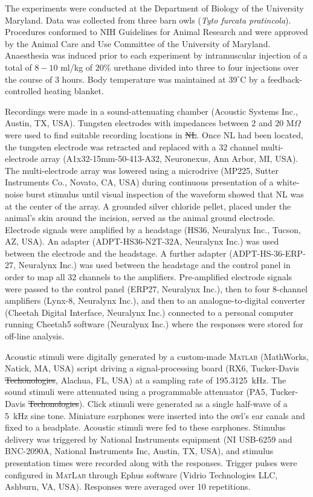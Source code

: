 \documentclass[]{article}
\providecommand{\DIFaddtex}[1]{{\protect\color{blue}\uwave{#1}}} %
\providecommand{\DIFdeltex}[1]{{\protect\color{red}\sout{#1}}}                      %
\providecommand{\DIFaddbegin}{} %
\providecommand{\DIFaddend}{} %
\providecommand{\DIFdelbegin}{} %
\providecommand{\DIFdelend}{} %
\providecommand{\DIFadd}[1]{\texorpdfstring{\DIFaddtex{#1}}{#1}} %
\providecommand{\DIFdel}[1]{\texorpdfstring{\DIFdeltex{#1}}{}} %
\begin{document}
The experiments were conducted at the Department of Biology of the
University \DIFaddbegin \DIFadd{of }\DIFaddend Maryland. Data was collected from three barn owls
(\emph{Tyto furcata pratincola}). Procedures conformed to NIH Guidelines
for Animal Research and were approved by the Animal Care and Use
Committee of the University of Maryland. Anaesthesia was induced prior
to each experiment by intramuscular injection of a total of \(8-10\)
ml/kg of \(20\%\) urethane divided into three to four injections over
the course of \(3\) hours. Body temperature was maintained at
\(39^\circ\)C by a feedback-controlled heating blanket.

Recordings were made in a sound-attenuating chamber (Acoustic Systems
Inc., Austin, TX, USA). Tungsten electrodes with impedances between
\(2\) and \(20\) M\(\Omega\) were used to find suitable recording
locations in \DIFdelbegin \DIFdel{NL}\DIFdelend \DIFaddbegin \DIFadd{nucleus laminaris (NL)}\DIFaddend . Once NL had been located, the
tungsten electrode was retracted and replaced with a 32 channel
multi-electrode array (A1x32-15mm-50-413-A32, Neuronexus, Ann Arbor, MI,
USA). The multi-electrode array was lowered using a microdrive (MP225,
Sutter Instruments Co., Novato, CA, USA) during continuous presentation
of a white-noise burst stimulus until visual inspection of the waveform
showed that NL was at the center of the array. A grounded silver
chloride pellet, placed under the animal's skin around the incision,
served as the animal ground electrode. Electrode signals were amplified
by a headstage (HS36, Neuralynx Inc., Tucson, AZ, USA). An adapter
(ADPT-HS36-N2T-32A, Neuralynx Inc.) was used between the electrode and
the headstage. A further adapter (ADPT-HS-36-ERP-27, Neuralynx Inc.) was
used between the headstage and the control panel in order to map all 32
channels to the amplifiers. Pre-amplified electrode signals were passed
to the control panel (ERP27, Neuralynx Inc.), then to four 8-channel
amplifiers (Lynx-8, Neuralynx Inc.), and then to an analogue-to-digital
converter (Cheetah Digital Interface, Neuralynx Inc.) connected to a
personal computer running Cheetah5 software (Neuralynx Inc.) where the
responses were stored for off-line analysis.

Acoustic stimuli were digitally generated by a custom-made
\textsc{Matlab} (MathWorks, Natick, MA, USA) script driving a
signal-processing board (RX6, Tucker-Davis \DIFdelbegin \DIFdel{Techonologies}\DIFdelend \DIFaddbegin \DIFadd{Technologies}\DIFaddend , Alachua, FL,
USA) at a sampling rate of 195.3125~kHz. The sound stimuli were
attenuated using a programmable attenuator (PA5, Tucker-Davis
\DIFdelbegin \DIFdel{Techonologies}\DIFdelend \DIFaddbegin \DIFadd{Technologies}\DIFaddend ). Click stimuli were generated as a single half-wave of a
5~kHz sine tone. Miniature earphones were inserted into the owl's ear
canals and fixed to a headplate. Acoustic stimuli were fed to these
earphones. Stimulus delivery was triggered by National Instruments
equipment (NI USB-6259 and BNC-2090A, National Instruments Inc, Austin,
TX, USA), and stimulus presentation times were recorded along with the
responses. Trigger pulses were configured in \textsc{MatLab} through
Ephus software (Vidrio Technologies LLC, Ashburn, VA, USA). Responses
were averaged over 10 repetitions.
\end{document}
